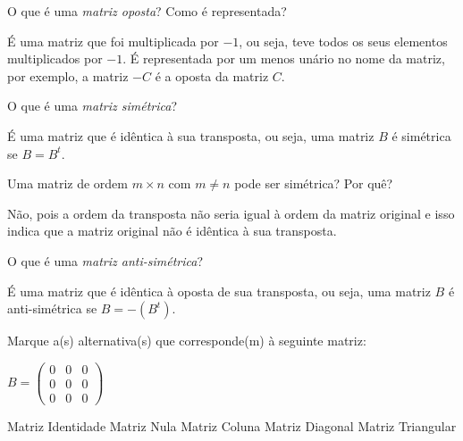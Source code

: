 \documentclass[pdftex, brazil, 12pt, oneside, addpoints]{exam}
\newcommand{\vf}[1][{}]{%
  \fillin[#1][0.25in]%
}
\begin{document}
\begin{questions}

\question
O que é uma \emph{matriz oposta}? Como é representada?
\begin{solutionorlines}[0.50in]
  É uma matriz que foi multiplicada por $-1$, ou seja, teve todos os seus
  elementos multiplicados por $-1$. É representada por um menos unário no
  nome da matriz, por exemplo, a matriz $-C$ é a oposta da matriz $C$.
\end{solutionorlines}

\question
O que é uma \emph{matriz simétrica}?
\begin{solutionorlines}[0.50in]
  É uma matriz que é idêntica à sua transposta, ou seja, uma matriz $B$
  é simétrica se $B = B^t$.
\end{solutionorlines}

\question
Uma matriz de ordem $m \times n$ com $m \ne n$ pode ser simétrica? Por quê?
\begin{solutionorlines}[0.50in]
  Não, pois a ordem da transposta não seria igual à ordem da matriz original e
  isso indica que a matriz original não é idêntica à sua transposta.
\end{solutionorlines}

\question
O que é uma \emph{matriz anti-simétrica}?
\begin{solutionorlines}[0.50in]
  É uma matriz que é idêntica à oposta de sua transposta, ou seja, uma matriz $B$
  é anti-simétrica se $B = -(B^t)$.
\end{solutionorlines}

\question
Marque a(s) alternativa(s) que corresponde(m) à seguinte matriz:

\hspace{5cm}$B = \begin{pmatrix}
  0 & 0 & 0\\
  0 & 0 & 0\\
  0 & 0 & 0
\end{pmatrix}$
\begin{checkboxes}
  \choice Matriz Identidade
  \CorrectChoice Matriz Nula
  \choice Matriz Coluna
  \CorrectChoice Matriz Diagonal
  \choice Matriz Triangular
\end{checkboxes}


\end{questions}
\end{document}
